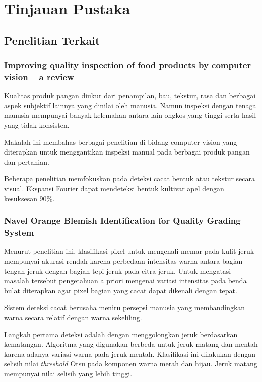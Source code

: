 \documentclass[laporan.tex]{subfiles}
\begin{document}
\chapter{Tinjauan Pustaka}

\section{Penelitian Terkait}

\subsection{Improving quality inspection of food products by computer vision – a review}

Kualitas produk pangan diukur dari penampilan, bau, tekstur, rasa dan berbagai aspek subjektif lainnya yang dinilai oleh manusia. Namun inspeksi dengan tenaga manusia mempunyai banyak kelemahan antara lain ongkos yang tinggi serta  hasil yang tidak konsisten.

Makalah ini\cite{brosnan} membahas berbagai penelitian di bidang computer vision yang diterapkan untuk menggantikan inspeksi manual pada berbagai produk pangan dan pertanian.

Beberapa penelitian memfokuskan pada deteksi cacat bentuk atau tekstur secara visual. Ekspansi Fourier dapat mendeteksi bentuk kultivar apel dengan kesuksesan 90\%.

\subsection{Navel Orange Blemish Identification for Quality Grading System}

Menurut penelitian ini, klasifikasi pixel untuk mengenali memar pada kulit jeruk mempunyai akurasi rendah karena perbedaan intensitas warna antara bagian tengah jeruk dengan bagian tepi jeruk pada citra jeruk. Untuk mengatasi masalah tersebut pengetahuan a priori mengenai variasi intensitas pada benda bulat diterapkan agar pixel bagian yang cacat dapat dikenali dengan tepat.\cite{liu}

Sistem deteksi cacat berusaha meniru persepsi manusia yang membandingkan warna secara relatif dengan warna sekeliling.

Langkah pertama deteksi adalah dengan menggolongkan jeruk berdasarkan kematangan. Algoritma yang digunakan berbeda untuk jeruk matang dan mentah karena adanya variasi warna pada jeruk mentah. Klasifikasi ini dilakukan dengan selisih nilai \emph{threshold} Otsu pada komponen warna merah dan hijau. Jeruk matang mempunyai nilai selisih yang lebih tinggi.
\end{document}
